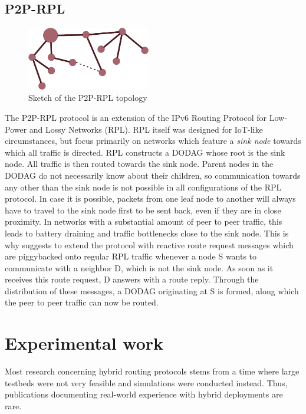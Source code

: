 \documentclass[a4paper,10pt]{scrartcl}
\begin{document}
\subsection{P2P-RPL}
\label{subsec:p2prpl}
\begin{figure}
  \begin{center}
    \includegraphics[width=0.48\textwidth]{../images/p2pRPL}
  \end{center}
  \label{fig:p2p}
  \caption{Sketch of the P2P-RPL topology}
\end{figure}

The P2P-RPL protocol is an extension of the IPv6 Routing Protocol for Low-Power and Lossy Networks (RPL)\cite{RPL}. RPL itself was designed for IoT-like circumstances, but focus primarily on networks which feature a \emph{sink node} towards which all traffic is directed. RPL constructs a \gls{DODAG} whose root is the sink node. All traffic is then routed towards the sink node. Parent nodes in the DODAG do not necessarily know about their children, so communication towards any other than the sink node is not possible in all configurations of the RPL protocol. In case it is possible, packets from one leaf node to another will always have to travel to the sink node first to be sent back, even if they are in close proximity. In networks with a substantial amount of peer to peer traffic, this leads to battery draining and traffic bottlenecks close to the sink node. This is why \cite{baccelli_p2p_rpl} suggests to extend the protocol with reactive route request messages which are piggybacked onto regular RPL traffic whenever a node S wants to communicate with a neighbor D, which is not the sink node. As soon as it receives this route request, D answers with a route reply. Through the distribution of these messages, a DODAG originating at S is formed, along which the peer to peer traffic can now be routed.

\section{Experimental work}
\label{sec:experiments}
Most research concerning hybrid routing protocols stems from a time where large testbeds were not very feasible and simulations were conducted instead. %
Thus, publications documenting real-world experience with hybrid deployments are rare.\\
\end{document}
